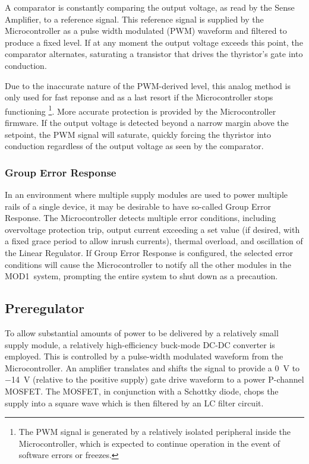 \documentclass[letterpaper,twocolumn,10pt,openany,oneside,final,fleqn]{memoir}
\newcommand{\Series}{MOD1\ }
\begin{document}
A comparator is constantly comparing the output voltage, as read by the Sense Amplifier,
to a reference signal. This reference signal is supplied by the Microcontroller as a
pulse width modulated (PWM) waveform and filtered to produce a fixed level. If at any moment
the output voltage exceeds this point, the comparator alternates, saturating a transistor
that drives the thyristor's gate into conduction.

Due to the inaccurate nature of the PWM-derived level, this analog method is only used
for fast reponse and as a last resort if the Microcontroller stops functioning
\footnote{The PWM signal is generated by a relatively isolated peripheral inside the
    Microcontroller, which is expected to continue operation in the event of software
    errors or freezes.}.
More accurate protection is provided by the Microcontroller firmware. If the output
voltage is detected beyond a narrow margin above the setpoint, the PWM signal will
saturate, quickly forcing the thyristor into conduction regardless of the output
voltage as seen by the comparator.

\subsubsection{Group Error Response}

In an environment where multiple supply modules are used to power multiple rails of a
single device, it may be desirable to have so-called Group Error Response. The
Microcontroller detects multiple error conditions, including overvoltage protection trip,
output current exceeding a set value (if desired, with a fixed grace period to allow
inrush currents), thermal overload, and oscillation of the Linear
Regulator. If Group Error Response is configured, the selected error conditions will
cause the Microcontroller to notify all the other modules in the \Series system, prompting
the entire system to shut down as a precaution.

\subsection{Preregulator}

To allow substantial amounts of power to be delivered by a relatively small supply module,
a relatively high-efficiency buck-mode DC-DC converter is employed. This is controlled by
a pulse-width modulated waveform from the Microcontroller. An amplifier translates and shifts
the signal to provide a \SI{0}{V} to \SI{-14}{V} (relative to the positive supply) gate
drive waveform to a power P-channel MOSFET. The MOSFET, in conjunction with a Schottky
diode, chops the supply into a square wave which is then filtered by an LC filter circuit.
\end{document}
